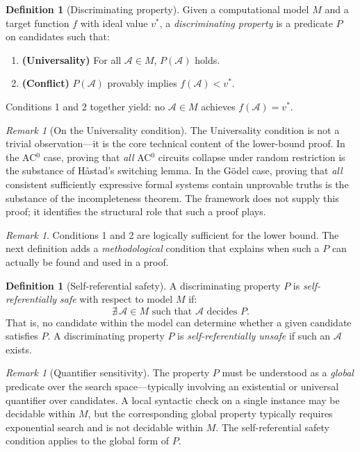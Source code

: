 \documentclass[11pt,a4paper]{article}
\theoremstyle{plain}
\theoremstyle{definition}
\newtheorem{definition}[theorem]{Definition}
\theoremstyle{remark}
\newtheorem{remark}[theorem]{Remark}
\begin{document}
\begin{definition}[Discriminating property]
\label{def:discrim}
Given a computational model $M$ and a target function $f$ with ideal value $v^*$, a \emph{discriminating property} is a predicate $P$ on candidates such that:
\begin{enumerate}
\item \textbf{(Universality)} For all $\mathcal{A} \in M$, $P(\mathcal{A})$ holds.
\item \textbf{(Conflict)} $P(\mathcal{A})$ provably implies $f(\mathcal{A}) < v^*$.
\end{enumerate}
Conditions 1 and 2 together yield: no $\mathcal{A} \in M$ achieves $f(\mathcal{A}) = v^*$.
\end{definition}

\begin{remark}[On the Universality condition]
The Universality condition is not a trivial observation---it is the core technical content of the lower-bound proof. In the AC$^0$ case, proving that \emph{all} AC$^0$ circuits collapse under random restriction is the substance of H\r{a}stad's switching lemma. In the G\"{o}del case, proving that \emph{all} consistent sufficiently expressive formal systems contain unprovable truths is the substance of the incompleteness theorem. The framework does not supply this proof; it identifies the structural role that such a proof plays.
\end{remark}

\begin{remark}
Conditions 1 and 2 are logically sufficient for the lower bound. The next definition adds a \emph{methodological} condition that explains when such a $P$ can actually be found and used in a proof.
\end{remark}

\begin{definition}[Self-referential safety]
\label{def:srs}
A discriminating property $P$ is \emph{self-referentially safe} with respect to model $M$ if:
$$\nexists\, \mathcal{A} \in M \text{ such that } \mathcal{A} \text{ decides } P.$$
That is, no candidate within the model can determine whether a given candidate satisfies $P$. A discriminating property $P$ is \emph{self-referentially unsafe} if such an $\mathcal{A}$ exists.
\end{definition}

\begin{remark}[Quantifier sensitivity]
The property $P$ must be understood as a \emph{global} predicate over the search space---typically involving an existential or universal quantifier over candidates. A local syntactic check on a single instance may be decidable within $M$, but the corresponding global property typically requires exponential search and is not decidable within $M$. The self-referential safety condition applies to the global form of $P$.
\end{remark}
\end{document}
